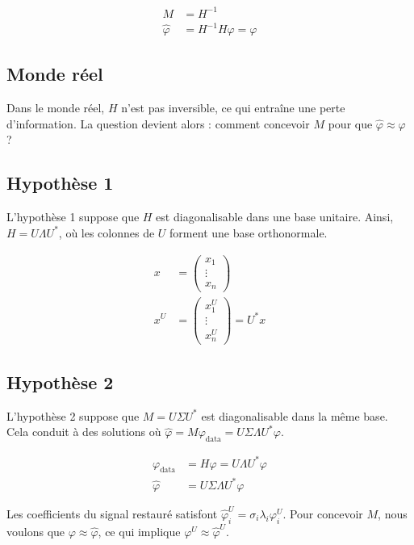 \documentclass[12pt]{article}
\begin{document}
\begin{align}
M &= H^{-1} \\
\hat{\varphi} &= H^{-1}H\varphi = \varphi
\end{align}

\subsection{Monde réel}

Dans le monde réel, $H$ n'est pas inversible, ce qui entraîne une perte d'information. La question devient alors : comment concevoir $M$ pour que $\hat{\varphi} \approx \varphi$ ?


\subsection{Hypothèse 1}

L'hypothèse 1 suppose que $H$ est diagonalisable dans une base unitaire. Ainsi, $H = U\Lambda U^*$, où les colonnes de $U$ forment une base orthonormale.

\begin{align}
x &= \begin{pmatrix} x_1 \\ \vdots \\ x_n \end{pmatrix} \\
x^U &= \begin{pmatrix} x_1^U \\ \vdots \\ x_n^U \end{pmatrix} = U^*x
\end{align}

\subsection{Hypothèse 2}

L'hypothèse 2 suppose que $M = U\Sigma U^*$ est diagonalisable dans la même base. Cela conduit à des solutions où $\hat{\varphi} = M\varphi_{\text{data}} = U\Sigma\Lambda U^*\varphi$.

\begin{align}
\varphi_{\text{data}} &= H\varphi = U\Lambda U^*\varphi \\
\hat{\varphi} &= U\Sigma\Lambda U^*\varphi
\end{align}

\begin{tcolorbox}[title={À retenir}]
Les coefficients du signal restauré satisfont $\hat{\varphi}_i^U = \sigma_i \lambda_i \varphi_i^U$. Pour concevoir $M$, nous voulons que $\varphi \approx \hat{\varphi}$, ce qui implique $\varphi^U \approx \hat{\varphi}^U$.
\end{tcolorbox}
\end{document}
